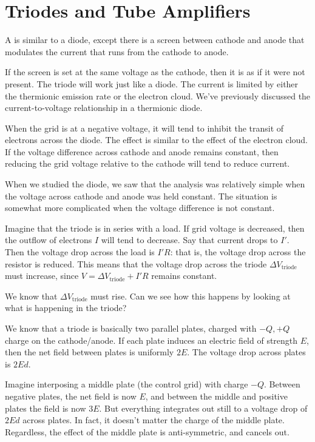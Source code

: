 \documentclass[11pt, oneside]{amsart}
\begin{document}
\section{Triodes and Tube Amplifiers}

A  is similar to a diode, except there is a screen
between cathode and anode that modulates the current that runs from the
cathode to anode.

If the screen is set at the same voltage as the cathode, then it is as
if it were not present. The triode will work just like a diode. The
current is limited by either the thermionic emission rate or the
electron cloud. We've previously discussed the current-to-voltage
relationship in a thermionic diode.

When the grid is at a negative voltage, it will tend to inhibit the
transit of electrons across the diode. The effect is similar to the
effect of the electron cloud. If the voltage difference across cathode
and anode remains constant, then reducing the grid voltage relative to
the cathode will tend to reduce current.

When we studied the diode, we saw that the analysis was relatively
simple when the voltage across cathode and anode was held constant. The
situation is somewhat more complicated when the voltage difference is
not constant.

Imagine that the triode is in series with a load. If grid voltage is
decreased, then the outflow of electrons $I$ will tend to decrease. Say
that current drops to $I'$. Then the voltage drop across the load is
$I'R$: that is, the voltage drop across the resistor is reduced. This
means that the voltage drop across the triode $\Delta V_\text{triode}$
must increase, since $V = \Delta V_\text{triode} + I'R$ remains
constant.

We know that $\Delta V_\text{triode}$ must rise. Can we see how this
happens by looking at what is happening in the triode?

We know that a triode is basically two parallel plates, charged with
$-Q, +Q$ charge on the cathode/anode. If each plate induces an electric
field of strength $E$, then the net field between plates is uniformly
$2E$. The voltage drop across plates is $2Ed$.

Imagine interposing a middle plate (the control grid) with charge $-Q$.
Between negative plates, the net field is now $E$, and between the
middle and positive plates the field is now $3E$. But everything
integrates out still to a voltage drop of $2Ed$ across plates. In fact,
it doesn't matter the charge of the middle plate. Regardless, the effect
of the middle plate is anti-symmetric, and cancels out.
\end{document}

